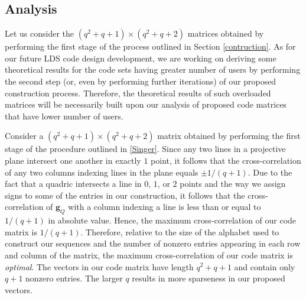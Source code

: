 \documentclass[journal,comsoc]{IEEEtran}
\begin{document}
\subsection{Analysis}
\label{Analysis}
Let us consider the $(q^2+q+1) \times (q^2+q+2)$ matrices obtained by performing the first stage of the process outlined in Section \ref{contruction}. As for our future LDS code design development, we are working on deriving some theoretical results for the code sets having greater number of users by performing the second step (or, even by performing further iterations) of our proposed construction process. Therefore, the theoretical results of such overloaded matrices will be necessarily built upon our analysis of proposed code matrices that have lower number of users.\iffalse (less overloaded cases).\fi

\iffalse Let us consider the maximum cross-correlation of the vectors in our code matrices. Let $\mathbf{C}$ be a $L \times K$ code matrix. Suppose that each column vector in $\mathbf{C}$ has exactly $s$ nonzero entries, each of which is either $1/\sqrt{s}$ or $-1/\sqrt{s}$. Furthermore, assume that $K>L$. Thus $\mathbf{C}$ cannot be an orthogonal matrix: indeed, the maximum cross-correlation of the columns of $\mathbf{C}$ must be greater than or equal to $1/s$. \fi

Consider a $(q^2+q+1)\times (q^2+q+2)$ matrix obtained by performing the first stage of the procedure outlined in \ref{Singer}. Since any two lines in a projective plane intersect one another in exactly $1$ point, it follows that the cross-correlation of any two columns indexing lines in the plane equals $\pm 1/(q+1).$ Due to the fact that a quadric intersects a line in $0$, $1$, or $2$ points and the way we assign signs to some of the entries in our construction, it follows that the cross-correlation of $\mathbf{g}_Q$ with a column indexing a line is less than or equal to $1/(q+1)$ in absolute value. Hence, the maximum cross-correlation of our code matrix is $1/(q+1)$. Therefore, relative to the size of the alphabet used to construct our sequences and the number of nonzero entries appearing in each row and column of the matrix, the maximum cross-correlation of our code matrix is \emph{optimal}. The vectors in our code matrix have length $q^2+q+1$ and contain only $q+1$ nonzero entries. \iffalse The sparseness condition where the number of zeros must be at least half of the length of the vector is definitely satisfied. \fi The larger $q$ results in more sparseness in our proposed vectors.
\end{document}
